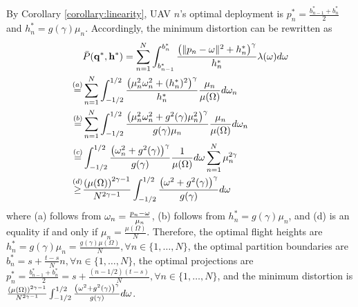 \documentclass[smallabstract,smallcaptions]{dccpaper}
\renewcommand{\vp}{\mathbf q}
\newcommand{\df}{\ensuremath{\lam}}         %
\newcommand{\bP}{\ensuremath{\vp}}          %
\newcommand{\abPo}{\ensuremath{\bar{P}}}  %
\newcommand{\bH}{\ensuremath{\vh}}          %
\newcommand{\Vor}{\ensuremath{\mathcal{V}}}         %
\newcommand{\philippstart}{\color{black}}
\newcommand{\philippend}{\color{black}}
\newcommand{\junend}{\color{black}}
\begin{document}
By Corollary \ref{corollary:linearity}, UAV $n$'s optimal deployment is $p^*_n=\frac{b^*_{n-1}+b^*_{n}}{2}$ and $h^*_n=g(\gamma)\mu_n$.
Accordingly, the minimum distortion can be rewritten as
\begin{align}
    &\abPo(\bP^*,\bH^*)=\sum_{n=1}^{N}\int_{b^*_{n-1}}^{b^*_{n}}\frac{\left(\|p_n-\ome\|^2+h^*_n\right)^{\gamma}}{h^*_n}\df(\ome) d\ome\\
    \overset{(a)}{=}&\sum_{n=1}^{N}\int_{-1/2}^{1/2} \frac{\left(\mu^2_n\ome^2_n+(h^*_n)^2\right)^{\gamma}}{h^*_n} \frac{\mu_n}{\mu(\Omega)}d\ome_n\\
    \overset{(b)}{=}&\sum_{n=1}^{N}\int_{-1/2}^{1/2}\frac{\left(\mu^2_n\ome^2_n+g^2(\gamma)\mu^2_n\right)^{\gamma}}{g(\gamma)\mu_n} \frac{\mu_n}{\mu(\Omega)}d\ome_n\\
    \overset{(c)}{=}&\int_{-1/2}^{1/2}\frac{\left(\ome^2_n+g^2(\gamma)\right)^{\gamma}}{g(\gamma)} \frac{1}{\mu(\Omega)}d\ome\sum_{n=1}^{N}\mu^{2\gamma}_n\\
    \overset{(d)}{\ge}&\frac{\left(\mu(\Omega)\right)^{2\gamma-1}}{N^{2\gamma-1}}\int_{-1/2}^{1/2}\frac{\left(\ome^2+g^2(\gamma)\right)^{\gamma}}{g(\gamma)} d\ome
  \end{align}
where (a) follows from $\omega_n=\frac{p_n-\omega}{\mu_n}$, (b) follows from $h^*_n=g(\gamma)\mu_n$, and (d) is an equality if and only if $\mu_n=\frac{\mu(\Omega)}{N}$.
Therefore, the optimal flight heights are $h^*_n=g(\gamma)\mu_n=\frac{g(\gamma)\mu(\Omega)}{N}, \forall n\in\{1,\dots,N\}$, the optimal partition boundaries are $b^*_n=s+\frac{t-s}{N}n, \forall n\in\{1,\dots,N\}$, the optimal projections are $p^*_n=\frac{b^*_{n-1}+b^*_{n}}{2}=s+\frac{(n-1/2)(t-s)}{N}, \forall n\in\{1,\dots,N\}$, and the minimum distortion is $\frac{\left(\mu(\Omega)\right)^{2\gamma-1}}{N^{2\gamma-1}}\int_{-1/2}^{1/2}\frac{\left(\omega^2+g^2(\gamma)\right)^{\gamma}}{g(\gamma)} d\omega$.
\fi
\junend
\philippstart
%
\philippend
%
%
\printbibliography
\end{document}
